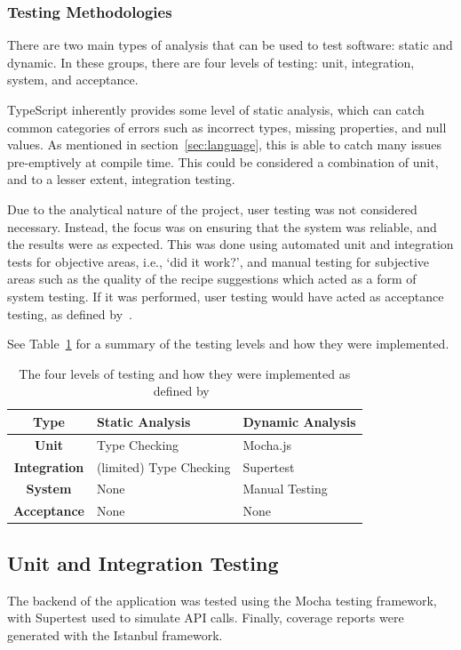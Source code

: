 \subsubsection{Testing Methodologies}

There are two main types of analysis that can be used to test software: static and dynamic. In these groups, there are
four levels of testing: unit, integration, system, and acceptance.~\cite{luo_software_2001}

TypeScript inherently provides some level of static analysis, which can catch common categories of errors such as
incorrect types, missing properties, and null values. As mentioned in section~\ref{sec:language}, this is able to
catch many issues pre-emptively at compile time. This could be considered a combination of unit, and to a lesser extent,
integration testing.

Due to the analytical nature of the project, user testing was not considered necessary. Instead, the focus was on ensuring
that the system was reliable, and the results were as expected. This was done using automated unit and integration tests for
objective areas, i.e., \enquote*{did it work?}, and manual testing for subjective areas such as the quality of the recipe
suggestions which acted as a form of system testing. If it was performed, user testing would have acted as acceptance testing,
as defined by~\cite{luo_software_2001}.

See Table~\ref{tab:test_types} for a summary of the testing levels and how they were implemented.

\begin{table}[hp]
    \centering
    \caption{\label{tab:test_types}The four levels of testing and how they were implemented as defined by~\cite{luo_software_2001}}
    \begin{tabular}{cll}\toprule
        \textbf{Type} & \textbf{Static Analysis} & \textbf{Dynamic Analysis} \\\midrule
        \textbf{Unit} & Type Checking & Mocha.js \\
        \textbf{Integration} & (limited) Type Checking & Supertest \\
        \textbf{System} & None & Manual Testing \\
        \textbf{Acceptance} & None & None \\
        \bottomrule
    \end{tabular}
\end{table}

\subsection{Unit and Integration Testing}
The backend of the application was tested using the Mocha testing framework, with Supertest
used to simulate API calls. Finally, coverage reports were generated with the Istanbul framework.


